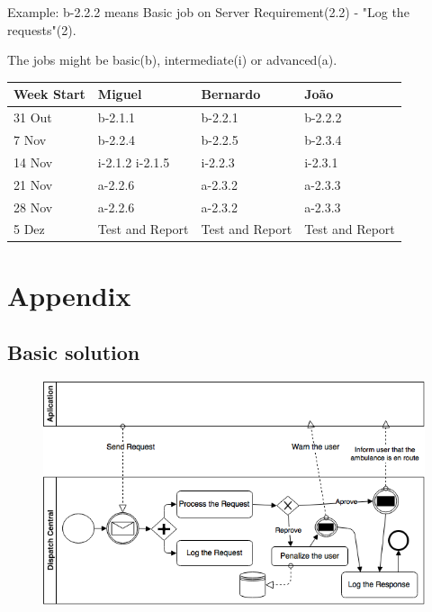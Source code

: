 \documentclass[a4paper,titlepage,11pt]{article}
\begin{document}
Example: b-2.2.2 means Basic job on Server Requirement(2.2) - "Log the requests"(2).

The jobs might be basic(b), intermediate(i) or advanced(a).
\begin{center}
    \begin{tabular}{| l || l | l | l |}
    \hline
    Week Start & Miguel & Bernardo & João \\ \hline \hline
    31 Out & b-2.1.1 & b-2.2.1 & b-2.2.2 \\
    7 Nov & b-2.2.4 & b-2.2.5 & b-2.3.4 \\
    14 Nov & i-2.1.2 i-2.1.5 & i-2.2.3 & i-2.3.1 \\
    21 Nov & a-2.2.6 & a-2.3.2 & a-2.3.3 \\
    28 Nov & a-2.2.6 & a-2.3.2 & a-2.3.3 \\
    5 Dez & Test and Report & Test and Report & Test and Report \\ \hline

    \end{tabular}
\end{center}

\section{Appendix}
\subsection{Basic solution}
\begin{figure}[h]
    \centering
    \includegraphics[scale=0.60]{img/basic-solution.png}
\end{figure}
\end{document}

